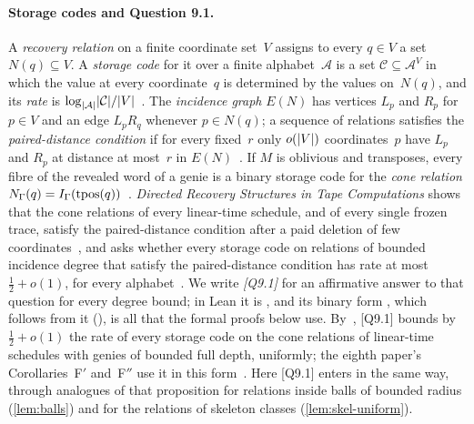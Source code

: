 \paragraph{Storage codes and Question 9.1.} A \emph{recovery relation} on a finite coordinate set~$V$ assigns to every
$q\in V$ a set $N(q)\subseteq V$. A \emph{storage code} for it over a finite alphabet~$\mathcal A$ is a set
$\mathcal C\subseteq\mathcal A^V$ in which the value at every coordinate~$q$ is determined by the values on~$N(q)$, and
its \emph{rate} is $\log_{\lvert \mathcal A \rvert}\lvert \mathcal C \rvert/\lvert V \rvert$~\cite[Definition~2.1]{DirectedRecovery2026}. The
\emph{incidence graph} $E(N)$ has vertices $L_p$ and $R_p$ for $p\in V$ and an edge $L_pR_q$ whenever $p\in N(q)$; a
sequence of relations satisfies the \emph{paired-distance condition} if for every fixed~$r$ only $o(\lvert V \rvert)$
coordinates~$p$ have $L_p$ and $R_p$ at distance at most~$r$ in $E(N)$~\cite[Definition~2.3]{DirectedRecovery2026}. If
$M$ is oblivious and transposes, every fibre of the revealed word of a genie is a binary storage code for the \emph{cone
relation} $N_\Gamma(q)=I_\Gamma(\operatorname{tpos}(q))$~\cite[Remark~4.9(b)]{FourthPaper2026}. \emph{Directed Recovery Structures in Tape
Computations} shows that the cone relations of every linear-time schedule, and of every single frozen trace, satisfy the
paired-distance condition after a paid deletion of few coordinates~\cite[Theorem~3.3, Corollary~3.8 and
Remark~3.9]{DirectedRecovery2026}, and asks whether every storage code on relations of bounded incidence degree that
satisfy the paired-distance condition has rate at most $\frac12+o(1)$, for every
alphabet~\cite[Question~9.1]{DirectedRecovery2026}. We write \emph{[Q9.1]} for an affirmative answer to that question for
every degree bound; in Lean it is , and its binary form , which follows
from it (), is all that the formal proofs below use.
By~\cite[Proposition~9.2]{DirectedRecovery2026}, [Q9.1] bounds by $\frac12+o(1)$ the rate of every storage code on the
cone relations of linear-time schedules with genies of bounded full depth, uniformly; the eighth paper's
Corollaries~F$'$ and~F$''$ use it in this form~\cite[Corollaries~6.3 and~6.4]{BoundedNesting2026}. Here [Q9.1] enters
in the same way, through analogues of that proposition for relations inside balls of bounded radius (\cref{lem:balls})
and for the relations of skeleton classes (\cref{lem:skel-uniform}).

